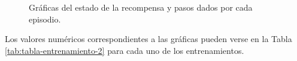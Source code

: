 \begin{figure}[ht!]
    \begin{center}
        \hspace{0.1cm}
    \end{center}
  \centering
  \captionsetup{justification=centering,margin=2cm}
  \caption{Gráficas del estado de la recompensa y pasos dados por cada episodio.}
  \label{fig:entrenamiento-2-2}
\end{figure}

Los valores numéricos correspondientes a las gráficas pueden verse en la Tabla \ref{tab:tabla-entrenamiento-2} para cada uno de los entrenamientos.

